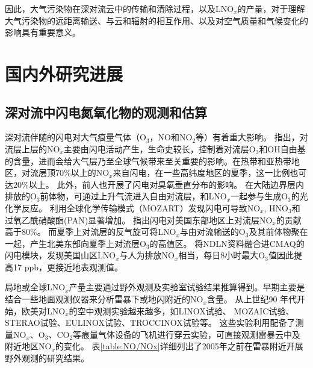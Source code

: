 因此，大气污染物在深对流云中的传输和清除过程，以及LNO$_x$的产量，对于理解大气污染物的远距离输送、与云和辐射的相互作用、以及对空气质量和气候变化的影响具有重要意义。



\section{国内外研究进展}

\subsection{深对流中闪电氮氧化物的观测和估算} \label{sec:intro_lnox}

深对流伴随的闪电对大气痕量气体（O$_3$，NO和NO$_2$等）有着重大影响\citep{DeCaria.2005,Schumann.2007,Ott.2010,Banerjee.2014}。
\citet{Levy.1996}指出，对流层上层的NO$_x$主要由闪电活动产生，生命史较长，控制着对流层O$_3$和OH自由基的含量，进而会给大气层乃至全球气候带来至关重要的影响。在热带和亚热带地区，对流层顶70\%以上的NO$_x$来自闪电，在一些高纬度地区的夏季，这一比例也可达20\%以上\citep{Jourdain.2001,Martin.2002}。
此外，前人也开展了闪电对臭氧垂直分布的影响。
在大陆边界层内排放的O$_3$前体物，可通过上升气流进入自由对流层，和LNO$_x$一起参与生成O$_3$的光化学反应\citep{Bond.2002}。
\citet{Tie.2001}利用全球化学传输模式（MOZART）发现闪电可导致NO$_x$, HNO$_3$和过氧乙酰硝酸酯(PAN)显著增加。
\citet{Cooper.2009}指出闪电对美国东部地区上对流层NO$_x$的贡献高于80\%。
而夏季上对流层的反气旋可将LNO$_x$与由对流输送的O$_3$及其前体物聚在一起，产生北美东部向夏季上对流层O$_3$的高值区。
\citet{Kang.2020}将NDLN资料融合进CMAQ的闪电模块，发现美国山区LNO$_x$与人为排放NO$_x$相当，每日8小时最大O$_3$值因此提高17 ppb，更接近地表观测值。

局地或全球LNO$_x$产量主要通过野外观测及实验室试验结果推算得到。早期主要是结合一些地面观测仪器来分析雷暴下或地闪附近的NO$_x$含量。
从上世纪90 年代开始，欧美对LNO$_x$的空中观测实验越来越多，如LINOX试验\citep{Huntrieser.1998}、 MOZAIC试验\citep{Marenco.1998}、
STERAO试验\citep{Dye.2000}、EULINOX试验\citep{Holler.2000}、TROCCINOX试验\citep{Huntrieser.2007}等。
这些实验利用配备了测量NO$_x$、O$_3$、CO$_2$等痕量气体设备的飞机进行穿云实验，可直接观测雷暴云中及附近地区NO$_x$的变化。
表\ref{table:NO/NOx}详细列出了2005年之前在雷暴附近开展野外观测的研究结果。

